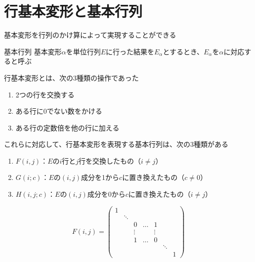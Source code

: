 \documentclass[../../../topic_linear-algebra]{subfiles}
\begin{document}
\sectionline
\section{行基本変形と基本行列}

基本変形を行列のかけ算によって実現することができる

\begin{definition}{基本行列}
  基本変形$\alpha$を単位行列$E$に行った結果を$E_\alpha$とするとき、$E_\alpha$を$\alpha$に対応すると呼ぶ
\end{definition}

行基本変形とは、次の3種類の操作であった

\begin{enumerate}[label=\romanlabel]
  \item 2つの行を交換する
  \item ある行に0でない数をかける
  \item ある行の定数倍を他の行に加える
\end{enumerate}

これらに対応して、行基本変形を表現する基本行列は、次の3種類がある

\begin{enumerate}[label=\romanlabel]
  \item $F(i,j)$：$E$の$i$行と$j$行を交換したもの（$i\neq j$）
  \item $G(i;c)$：$E$の$(i,j)$成分を1から$c$に置き換えたもの（$c\neq 0$）
  \item $H(i,j;c)$：$E$の$(i,j)$成分を0から$c$に置き換えたもの（$i \neq j$）
\end{enumerate}

\begin{equation*}
  F(i,j) = \begin{pmatrix}
    1                                                \\
     & \ddots                                        \\
     &        & 0      & \dots & 1                   \\
     &        & \vdots &       & \vdots              \\
     &        & 1      & \dots & 0                   \\
     &        &        &       &        & \ddots     \\
     &        &        &       &        &        & 1
  \end{pmatrix}
\end{equation*}
\end{document}
